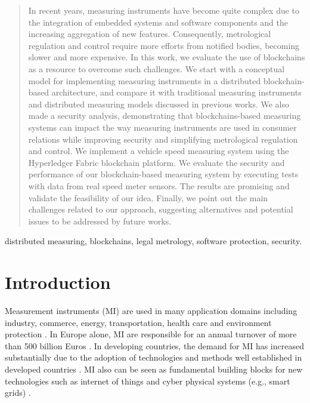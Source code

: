 \documentclass[journal]{IEEEtran}
\begin{document}
\begin{abstract}
In recent years, measuring instruments have become quite complex due to the integration of embedded systems and software components and the increasing aggregation of new features. 
Consequently, metrological regulation and control require more efforts from notified bodies, becoming slower and more expensive. 
In this work, we evaluate the use of blockchains as a resource to overcome such challenges.
We start with a conceptual model for implementing measuring instruments in a distributed blockchain-based architecture, and compare it with traditional measuring instruments and distributed measuring models discussed in previous works. 
We also made a security analysis, demonstrating that blockchains-based measuring systems can impact the way measuring instruments are used in consumer relations while improving security and simplifying metrological regulation and control.
We implement a vehicle speed measuring system using the Hyperledger Fabric blockchain platform.
We evaluate the security and performance of our blockchain-based measuring system by executing tests with data from real speed meter sensors.
The results are promising and validate the feasibility of our idea.
Finally, we point out the main challenges related to our approach, suggesting alternatives and potential issues to be addressed by future works.
\end{abstract}

\begin{IEEEkeywords}
 distributed measuring, blockchains, legal metrology, software protection, security.
\end{IEEEkeywords}



%
\IEEEpeerreviewmaketitle

\section{Introduction}
Measurement instruments (MI) are used in many application domains including industry, commerce, energy, transportation, health care and environment protection \cite{RodriguesFilho2015}. 
In Europe alone, MI are responsible for an annual turnover of more than 500 billion Euros \cite{Esche2015}. 
In developing countries, the demand for MI has increased substantially due to the adoption of technologies and methods well established in developed countries \cite{RodriguesFilho2015}. 
MI also can be seen as fundamental building blocks for new technologies such as internet of things and cyber physical systems (e.g., smart grids) \cite{RodriguesFilho2015,Esche2015,Camara2012,Boccardo2014,Peters2015,Oppermann2018}. 
\end{document}
